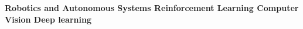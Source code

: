 \begin{cventries}
\begin{flushleft}
\textbf{{\fontsize{10pt}{1em}\bodyfontlight\upshape\color{text}  
    \bullet \space \textbf{Robotics and Autonomous Systems}\newline
    \bullet \space \textbf{Reinforcement Learning}\newline
    \bullet \space \textbf{Computer Vision}\newline
    \bullet \space \textbf{Deep learning}\newline
    }}
\end{flushleft}
\end{cventries}
